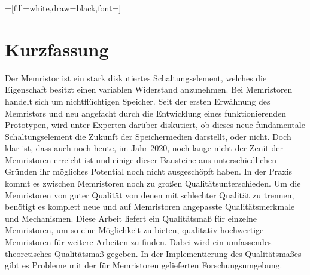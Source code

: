 \documentclass[
enabledeprecatedfontcommands, %
12pt,                  %
a4paper,               %
titlepage,             %
headsepline,
appendixprefix,        %
headings=normal,       %
parskip=half*,         %
captions=tableheading, %
chapterprefix,         %
twoside,               %
BCOR=15mm,			   %
bibliography=totoc,
numbers=noenddot,
version
]{scrbook}
\begin{document}
\pgfplotsset{width=10cm,compat=1.6}	%

=[fill=white,draw=black,font=\footnotesize]	%


%


\thispagestyle{headings}
\begin{titlepage}

\end{titlepage}





\thispagestyle{empty}
\null\newpage
\thispagestyle{empty}



\thispagestyle{empty}
\null\newpage
\thispagestyle{empty}



\chapter*{Kurzfassung}

Der Memristor ist ein stark diskutiertes Schaltungselement, welches die Eigenschaft besitzt einen variablen Widerstand anzunehmen. Bei Memristoren handelt sich um nichtflüchtigen Speicher. Seit der ersten Erwähnung des Memristors und neu angefacht durch die Entwicklung eines funktionierenden Prototypen, wird unter Experten darüber diskutiert, ob dieses neue fundamentale Schaltungselement die Zukunft der Speichermedien darstellt, oder nicht. Doch klar ist, dass auch noch heute, im Jahr 2020, noch lange nicht der Zenit der Memristoren erreicht ist und einige dieser Bausteine aus unterschiedlichen Gründen ihr mögliches Potential noch nicht ausgeschöpft haben. In der Praxis kommt es zwischen Memristoren noch zu großen Qualitätsunterschieden. Um die Memristoren von guter Qualität von denen mit schlechter Qualität zu trennen, benötigt es komplett neue und auf Memristoren angepasste Qualitätsmerkmale und Mechanismen. Diese Arbeit liefert ein Qualitätsmaß für einzelne Memristoren, um so eine Möglichkeit zu bieten, qualitativ hochwertige Memristoren für weitere Arbeiten zu finden. Dabei wird ein umfassendes theoretisches Qualitätsmaß gegeben. In der Implementierung des Qualitätsmaßes gibt es Probleme mit der für Memristoren gelieferten Forschungsumgebung.
\end{document}
